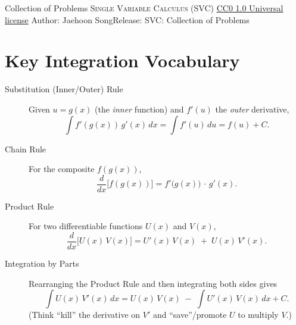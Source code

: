 \handout
{Collection of Problems}
{\textsc{Single Variable Calculus (SVC)}}
{\href{https://creativecommons.org/publicdomain/zero/1.0/}{CC0 1.0 Universal license}}
{Author: Jaehoon Song}{Release: \generatedOn}
{SVC: Collection of Problems}







\section*{Key Integration Vocabulary}

\begin{description}
  \item[Substitution (Inner/Outer) Rule] 
    Given $u = g(x)$ (the \emph{inner} function) and $f'(u)$ the \emph{outer} derivative, 
    \[
      \int f'(g(x))\,g'(x)\,dx
      = \int f'(u)\,du
      = f(u) + C.
    \]
  
  \item[Chain Rule]
    For the composite $f(g(x))$,
    \[
      \frac{d}{dx}\bigl[f(g(x))\bigr]
      = f'\bigl(g(x)\bigr)\,\cdot\,g'(x).
    \]
  
  \item[Product Rule]
    For two differentiable functions $U(x)$ and $V(x)$,
    \[
      \frac{d}{dx}\bigl[U(x)\,V(x)\bigr]
      = U'(x)\,V(x) \;+\; U(x)\,V'(x).
    \]
  
  \item[Integration by Parts]
    Rearranging the Product Rule and then integrating both sides gives
    \[
      \int U(x)\,V'(x)\,dx
      = U(x)\,V(x)
      \;-\;
      \int U'(x)\,V(x)\,dx
      + C.
    \]
    (Think “kill” the derivative on $V'$ and “save”/promote $U$ to multiply $V$.)
\end{description}
\newpage






